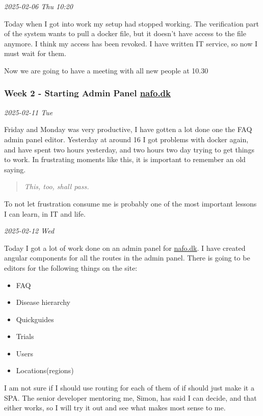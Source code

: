 \documentclass[../main.tex]{subfiles}
\begin{document}
\bigskip
\noindent \textit{2025-02-06 Thu 10:20}
\smallskip

Today when I got into work my setup had stopped working. The verification part of the system wants to pull a docker file, but it doesn't have access to the file anymore. I think my access has been revoked. I have written IT service, so now I must wait for them.

Now we are going to have a meeting with all new people at 10.30 

\subsubsection{Week 2 - Starting Admin Panel \href{https://www.nationaltforsoegsoverblik.dk/}{nafo.dk}}
\noindent \textit{2025-02-11 Tue}
\smallskip

Friday and Monday was very productive, I have gotten a lot done one the FAQ admin panel editor. Yesterday at around 16 I got problems with docker again, and have spent two hours yesterday, and two hours two day trying to get things to work. In frustrating moments like this, it is important to remember an old saying.

\begin{quote}
\emph{This, too, shall pass.}
\end{quote}

To not let frustration consume me is probably one of the most important lessons I can learn, in IT and life.

\bigskip
\noindent \textit{2025-02-12 Wed}
\smallskip

Today I got a lot of work done on an admin panel for \href{https://www.nationaltforsoegsoverblik.dk/}{nafo.dk}. I have created angular components for all the routes in the admin panel.  There is going to be editors for the following things on the site:

\begin{itemize}
\item FAQ
\item Disease hierarchy
\item Quickguides
\item Trials
\item Users
\item Locations(regions)
\end{itemize}

I am not sure if I should use routing for each of them of if should just make it a SPA. The senior developer mentoring me, Simon, has said I can decide, and that either works, so I will try it out and see what makes most sense to me.
\end{document}
